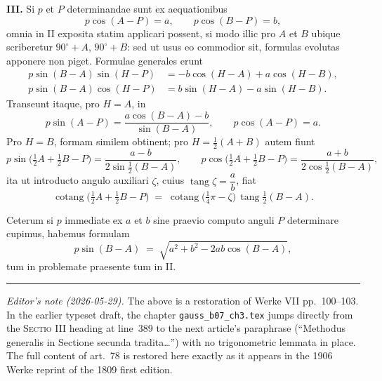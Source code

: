 \documentclass[11pt,a4paper]{article}
\newcommand{\tang}{\operatorname{tang}}
\newcommand{\cotang}{\operatorname{cotang}}
\begin{document}
\textbf{III.} Si $p$ et $P$ determinandae sunt ex aequationibus
\[
  p \cos(A-P) = a,\qquad p \cos(B-P) = b,
\]
omnia in II exposita statim applicari possent, si modo illic pro $A$ et $B$
ubique scriberetur $90^{\circ}+A$, $90^{\circ}+B$: sed ut usus eo commodior
sit, formulas evolutas apponere non piget. Formulae generales erunt
\begin{align*}
  p \sin(B-A) \sin(H-P) &= -b\cos(H-A) + a\cos(H-B),\\
  p \sin(B-A) \cos(H-P) &=  b\sin(H-A) - a\sin(H-B).
\end{align*}
Transeunt itaque, pro $H = A$, in
\[
  p\sin(A-P) = \frac{a\cos(B-A) - b}{\sin(B-A)},\qquad
  p\cos(A-P) = a.
\]
Pro $H = B$, formam similem obtinent; pro $H = \tfrac{1}{2}(A+B)$ autem
fiunt
\[
  p\sin\!\bigl(\tfrac{1}{2}A+\tfrac{1}{2}B - P\bigr)
     = \frac{a-b}{2\sin\tfrac{1}{2}(B-A)},\qquad
  p\cos\!\bigl(\tfrac{1}{2}A+\tfrac{1}{2}B - P\bigr)
     = \frac{a+b}{2\cos\tfrac{1}{2}(B-A)},
\]
ita ut introducto angulo auxiliari $\zeta$, cuius
$\tang\zeta = \dfrac{a}{b}$, fiat
\[
  \cotang\!\bigl(\tfrac{1}{2}A+\tfrac{1}{2}B - P\bigr)
   \;=\; \cotang\!\bigl(\tfrac{1}{4}\pi - \zeta\bigr)\,\tang\tfrac{1}{2}(B-A).
\]

\medskip

Ceterum si $p$ immediate ex $a$ et $b$ sine praevio computo anguli $P$
determinare cupimus, habemus formulam
\[
  p\sin(B-A) \;=\; \sqrt{a^{2} + b^{2} - 2ab\cos(B-A)},
\]
tum in problemate praesente tum in II.

\bigskip
\hrule
\bigskip

\noindent\emph{Editor's note (2026-05-29).} The above is a restoration of
Werke VII pp.~100--103. In the earlier typeset draft, the chapter
\verb|gauss_b07_ch3.tex| jumps directly from the \textsc{Sectio III}
heading at line~389 to the next article's paraphrase
(``Methodus generalis in Sectione secunda tradita\ldots'') with no
trigonometric lemmata in place. The full content of art.~78 is restored
here exactly as it appears in the 1906 Werke reprint of the 1809 first
edition.
\end{document}

